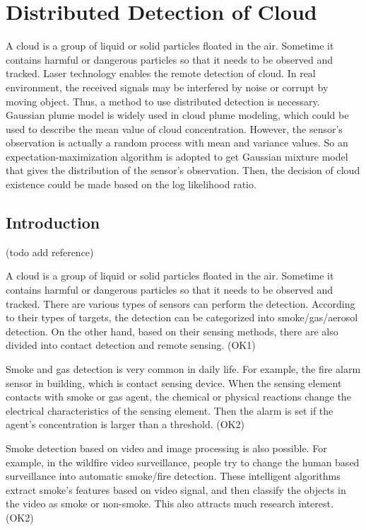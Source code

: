 
\section{Distributed Detection of Cloud}

A cloud is a group of liquid or solid particles floated in the air.
Sometime it contains harmful or dangerous particles so that it needs
to be observed and tracked. Laser technology enables the remote detection
of cloud. In real environment, the received signals may be interfered
by noise or corrupt by moving object. Thus, a method to use distributed
detection is necessary. Gaussian plume model is widely used in cloud
plume modeling, which could be used to describe the mean value of
cloud concentration. However, the sensor's observation is actually
a random process with mean and variance values. So an expectation-maximization
algorithm is adopted to get Gaussian mixture model that gives the
distribution of the sensor\textquoteright{}s observation. Then, the
decision of cloud existence could be made based on the log likelihood
ratio.


\subsection{Introduction }

(todo add reference)

A cloud is a group of liquid or solid particles floated in the air.
Sometime it contains harmful or dangerous particles so that it needs
to be observed and tracked. There are various types of sensors can
perform the detection. According to their types of targets, the detection
can be categorized into smoke/gas/aerosol detection. On the other
hand, based on their sensing methods, there are also divided into
contact detection and remote sensing. (OK1)

Smoke and gas detection is very common in daily life. For example,
the fire alarm sensor in building, which is contact sensing device.
When the sensing element contacts with smoke or gas agent, the chemical
or physical reactions change the electrical characteristics of the
sensing element. Then the alarm is set if the agent's concentration
is larger than a threshold. (OK2)

Smoke detection based on video and image processing is also possible.
For example, in the wildfire video surveillance, people try to change
the human based surveillance into automatic smoke/fire detection.
These intelligent algorithms extract smoke's features based on video
signal, and then classify the objects in the video as smoke or non-smoke.
This also attracts much research interest. (OK2)


